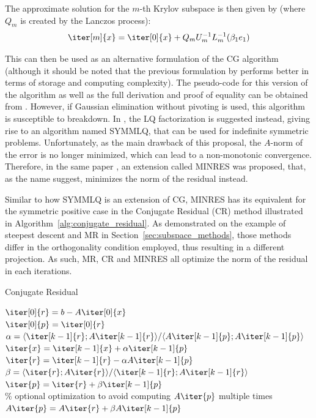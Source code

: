 \noindent The approximate solution for the $m$-th Krylov subspace is then given by (where $Q_m$ is created by the Lanczos process):
\begin{equation}
    \iter[m]{x} = \iter[0]{x} + Q_m U_m^{-1}L_m^{-1}(\beta_1 e_1)
\end{equation}

\noindent This can then be used as an alternative formulation of the CG algorithm (although it should be noted that the previous formulation by \cite{hestenes_methods_1952} performs better in terms of storage and computing complexity). The pseudo-code for this version of the algorithm as well as the full derivation and proof of equality can be obtained from \cite{saad_iterative_2003}. However, if Gaussian elimination without pivoting is used, this algorithm is susceptible to breakdown. In \cite{paige_solution_1975}, the LQ factorization is suggested instead, giving rise to an algorithm named SYMMLQ, that can be used for indefinite symmetric problems. Unfortunately, as the main drawback of this proposal, the $A$-norm of the error is no longer minimized, which can lead to a non-monotonic convergence. Therefore, in the same paper \cite{paige_solution_1975}, an extension called MINRES was proposed, that, as the name suggest, minimizes the norm of the residual instead.

Similar to how SYMMLQ is an extension of CG, MINRES has its equivalent for the symmetric positive case in the Conjugate Residual (CR) method illustrated in Algorithm~\hyperref[alg:conjugate_residual]{\ref{alg:conjugate_residual}}. As demonstrated on the example of steepest descent and MR in Section~\hyperref[sec:subspace_methods]{\ref{sec:subspace_methods}}, those methods differ in the orthogonality condition employed, thus resulting in a different projection. As such, MR, CR and MINRES all optimize the norm of the residual in each iterations.


\begin{algorithm}[h]
  \caption{Conjugate Residual}
  \label{alg:conjugate_residual}
  \SetAlgoLined
  \DontPrintSemicolon
  $\iter[0]{r} = b-A\iter[0]{x}$ \\
  $\iter[0]{p} = \iter[0]{r}$ \\
   {
    $\alpha = \langle \iter[k-1]{r};A\iter[k-1]{r} \rangle / \langle A\iter[k-1]{p};A\iter[k-1]{p} \rangle$ \\
    $\iter{x} = \iter[k-1]{x}+\alpha \iter[k-1]{p}$ \\
    $\iter{r} = \iter[k-1]{r} - \alpha A\iter[k-1]{p}$ \\
    $\beta = \langle \iter{r};A\iter{r} \rangle / \langle \iter[k-1]{r};A\iter[k-1]{r} \rangle$ \\
    $\iter{p} = \iter{r} + \beta \iter[k-1]{p}$ \\
    \% optional optimization to avoid computing $A\iter{p}$ multiple times \\
    $A\iter{p} = A\iter{r}+\beta A\iter[k-1]{p}$
  }
\end{algorithm}

